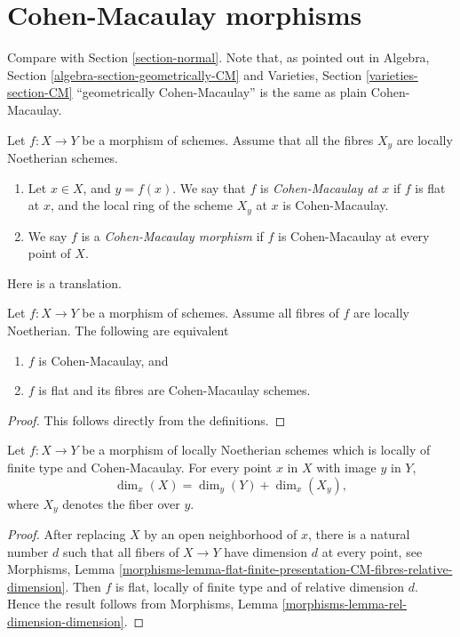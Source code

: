\section{Cohen-Macaulay morphisms}
\label{section-CM}

\noindent
Compare with Section \ref{section-normal}.
Note that, as pointed out in
Algebra, Section \ref{algebra-section-geometrically-CM}
and
Varieties, Section \ref{varieties-section-CM}
``geometrically Cohen-Macaulay'' is the same as plain Cohen-Macaulay.

\begin{definition}
\label{definition-CM}
Let $f : X \to Y$ be a morphism of schemes.
Assume that all the fibres $X_y$ are locally Noetherian schemes.
\begin{enumerate}
\item Let $x \in X$, and $y = f(x)$. We say that $f$ is
{\it Cohen-Macaulay at $x$} if $f$ is flat at $x$, and the
local ring of the scheme $X_y$ at $x$ is Cohen-Macaulay.
\item We say $f$ is a {\it Cohen-Macaulay morphism} if $f$ is
Cohen-Macaulay at every point of $X$.
\end{enumerate}
\end{definition}

\noindent
Here is a translation.

\begin{lemma}
\label{lemma-CM}
Let $f : X \to Y$ be a morphism of schemes.
Assume all fibres of $f$ are locally Noetherian.
The following are equivalent
\begin{enumerate}
\item $f$ is Cohen-Macaulay, and
\item $f$ is flat and its fibres are Cohen-Macaulay schemes.
\end{enumerate}
\end{lemma}

\begin{proof}
This follows directly from the definitions.
\end{proof}

\begin{lemma}
\label{lemma-CM-dimension}
Let $f : X \to Y$ be a morphism of locally Noetherian schemes
which is locally of finite type and Cohen-Macaulay.
For every point $x$ in $X$ with image $y$ in $Y$,
$$
\dim_x(X) = \dim_y(Y) + \dim_x(X_y),
$$
where $X_y$ denotes the fiber over $y$.
\end{lemma}

\begin{proof}
After replacing $X$ by an open neighborhood of $x$,
there is a natural number $d$ such that all fibers
of $X \to Y$ have dimension $d$ at every point, see
Morphisms, Lemma
\ref{morphisms-lemma-flat-finite-presentation-CM-fibres-relative-dimension}.
Then $f$ is flat, locally of finite type
and of relative dimension $d$. Hence the result follows from
Morphisms, Lemma \ref{morphisms-lemma-rel-dimension-dimension}.
\end{proof}

